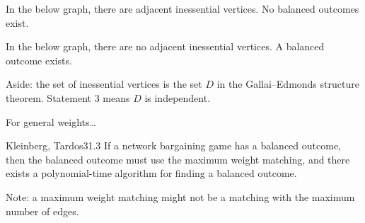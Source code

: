 \documentclass[12pt,letterpaper]{report}
\begin{document}
\begin{ex}
  In the below graph, there are adjacent inessential vertices.
  No balanced outcomes exist.
  \begin{center}
  \end{center}
  In the below graph, there are no adjacent inessential vertices.
  A balanced outcome exists.
  \begin{center}
  \end{center}
\end{ex}
Aside: the set of inessential vertices is the set $D$ in the Gallai--Edmonds structure theorem.
Statement 3 means $D$ is independent.

For general weights\dots

\begin{thm}{Kleinberg, Tardos}{31.3}
  If a network bargaining game has a balanced outcome, then the balanced outcome must use the
  maximum weight matching, and there exists a polynomial-time algorithm for finding a balanced
  outcome.
\end{thm}

Note: a maximum weight matching might not be a matching with the maximum number of edges.

\end{document}
